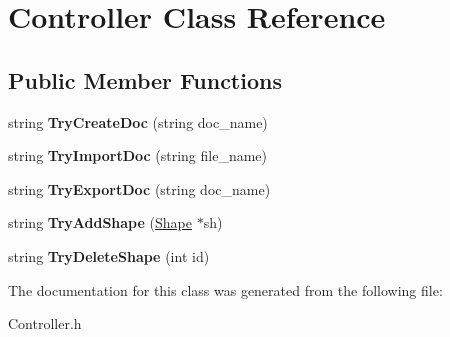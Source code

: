 \hypertarget{classController}{}\section{Controller Class Reference}
\label{classController}
\subsection*{Public Member Functions}
\begin{DoxyCompactItemize}
\item 
\mbox{\label{classController_a5142644028f7cf70b09cf885c64428f0}} 
string {\bfseries Try\+Create\+Doc} (string doc\+\_\+name)
\item 
\mbox{\label{classController_a6739b744868bd5a8a686c3344946205a}} 
string {\bfseries Try\+Import\+Doc} (string file\+\_\+name)
\item 
\mbox{\label{classController_a157b0af634941d56ef6ca9d2f6528922}} 
string {\bfseries Try\+Export\+Doc} (string doc\+\_\+name)
\item 
\mbox{\label{classController_afc73a770c24d9d176d8207513ac94c37}} 
string {\bfseries Try\+Add\+Shape} (\hyperlink{classShape}{Shape} $\ast$sh)
\item 
\mbox{\label{classController_aeeb1002b81c93c77abef9bf6c38347fa}} 
string {\bfseries Try\+Delete\+Shape} (int id)
\end{DoxyCompactItemize}


The documentation for this class was generated from the following file\+:\begin{DoxyCompactItemize}
\item 
Controller.\+h\end{DoxyCompactItemize}

